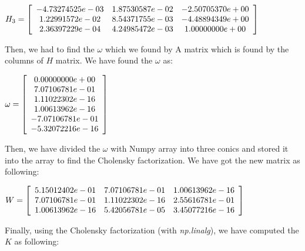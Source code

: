 \documentclass[]{article}
\begin{document}
\vspace{0.5em}


\centerline {
	$H_3 =\left[ {\begin{array}{*{20}c}
		-4.73274525e-03 & 1.87530587e-02 & -2.50705370e+00 \\
		1.22991572e-02 & 8.54371755e-03 & -4.48894349e+00  \\ 
		2.36397229e-04 & 4.24985472e-03 & 1.00000000e+00
		\end{array} } \right] $
}

\vspace{0.5em}

Then, we had to find the $\omega$ which we found by A matrix which is found by the columns of $H$ matrix. We have found the $\omega$ as:

\vspace{0.5em}

\centerline {
	$ \omega =\left[ {\begin{array}{*{20}c}
		0.00000000e+00 \\
		7.07106781e-01 \\
		1.11022302e-16 \\
		1.00613962e-16 \\ 
		-7.07106781e-01 \\
		-5.32072216e-16
		\end{array} } \right] $
}

\vspace{0.5em}

Then, we have divided the $\omega$ with Numpy array into three conics and stored it into the array to find the Cholensky factorization. We have got the new matrix as following:

\vspace{0.5em}

\centerline {
	$ W =\left[ {\begin{array}{*{20}c}
		5.15012402e-01 & 7.07106781e-01 & 1.00613962e-16 \\
		7.07106781e-01 & 1.11022302e-16 & 2.55616781e-01\\
		1.00613962e-16 & 5.42056781e-05 & 3.45077216e-16 
		\end{array} } \right] $
}

\vspace{0.5em}

Finally, using the Cholensky factorization (with \textit{np.linalg}), we have computed the $K$ as following:

\vspace{0.5em}
\end{document}
